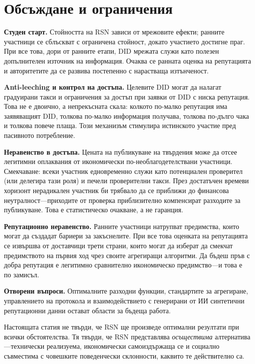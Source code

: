 \documentclass[11pt,a4paper,twocolumn]{article}
\begin{document}
\section{Обсъждане и ограничения}

\textbf{Студен старт.} Стойността на RSN зависи от мрежовите ефекти; ранните участници се сблъскват с ограничена стойност, докато участието достигне праг. При все това, дори от ранните етапи, DID мрежата служи като полезен допълнителен източник на информация. Очаква се ранната оценка на репутацията и авторитетите да се развива постепенно с нарастваща изтънченост.

\textbf{Anti-leeching и контрол на достъпа.} Целевите DID могат да налагат градуирани такси и ограничения за достъп при заявки от DID с ниска репутация. Това не е двоично, а непрекъсната скала: колкото по-малко репутация има заявяващият DID, толкова по-малко информация получава, толкова по-дълго чака и толкова повече плаща. Този механизъм стимулира истинското участие пред пасивното потребление.

\textbf{Неравенство в достъпа.} Цената на публикуване на твърдения може да отсее легитимни оплаквания от икономически по-необлагодетелствани участници. Смекчаване: всеки участник едновременно служи като потенциален проверител (или делегира тази роля) и печели проверителни такси. През достатъчен времеви хоризонт нерадикален участник би трябвало да се приближи до финансова неутралност---приходите от проверка приблизително компенсират разходите за публикуване. Това е статистическо очакване, а не гаранция.

\textbf{Репутационно неравенство.} Ранните участници натрупват предимства, които могат да създадат бариери за закъснелите. При все това оценката на репутацията се извършва от доставчици трети страни, които могат да изберат да смекчат предимството на първия ход чрез своите агрегиращи алгоритми. Да бъдеш пръв с добра репутация е легитимно сравнително икономическо предимство---и това е по замисъл.

\textbf{Отворени въпроси.} Оптималните разходни функции, стандартите за агрегиране, управлението на протокола и взаимодействието с генерирани от ИИ синтетични репутационни данни остават области за бъдеща работа.

Настоящата статия не твърди, че RSN ще произведе оптимални резултати при всички обстоятелства. Тя твърди, че RSN представлява \emph{осъществима} алтернатива---технически реализуема, икономически самоиздържаща се и социално съвместима с човешките поведенчески склонности, каквито те действително са.
\end{document}
